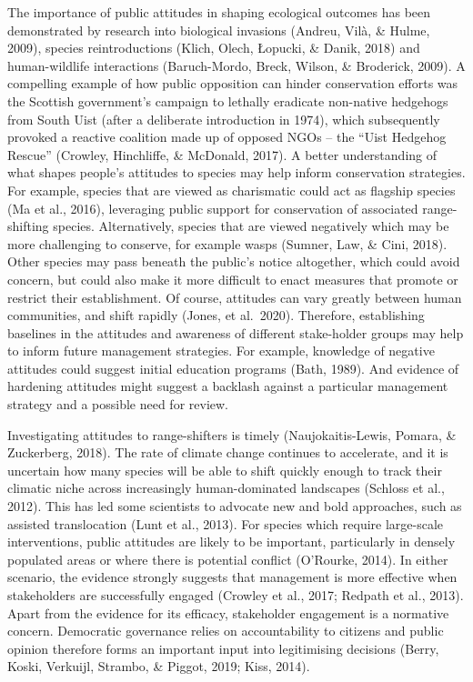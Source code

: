 \documentclass[
]{article}
\begin{document}
The importance of public attitudes in shaping ecological outcomes has
been demonstrated by research into biological invasions (Andreu, Vilà,
\& Hulme, 2009), species reintroductions (Klich, Olech, Łopucki, \&
Danik, 2018) and human-wildlife interactions (Baruch-Mordo, Breck,
Wilson, \& Broderick, 2009). A compelling example of how public
opposition can hinder conservation efforts was the Scottish government's
campaign to lethally eradicate non-native hedgehogs from South Uist
(after a deliberate introduction in 1974), which subsequently provoked a
reactive coalition made up of opposed NGOs -- the ``Uist Hedgehog
Rescue'' (Crowley, Hinchliffe, \& McDonald, 2017). A better
understanding of what shapes people's attitudes to species may help
inform conservation strategies. For example, species that are viewed as
charismatic could act as flagship species (Ma et al., 2016), leveraging
public support for conservation of associated range-shifting species.
Alternatively, species that are viewed negatively which may be more
challenging to conserve, for example wasps (Sumner, Law, \& Cini, 2018).
Other species may pass beneath the public's notice altogether, which
could avoid concern, but could also make it more difficult to enact
measures that promote or restrict their establishment. Of course,
attitudes can vary greatly between human communities, and shift rapidly
(Jones, et al.~2020). Therefore, establishing baselines in the attitudes
and awareness of different stake-holder groups may help to inform future
management strategies. For example, knowledge of negative attitudes
could suggest initial education programs (Bath, 1989). And evidence of
hardening attitudes might suggest a backlash against a particular
management strategy and a possible need for review.

Investigating attitudes to range-shifters is timely (Naujokaitis-Lewis,
Pomara, \& Zuckerberg, 2018). The rate of climate change continues to
accelerate, and it is uncertain how many species will be able to shift
quickly enough to track their climatic niche across increasingly
human-dominated landscapes (Schloss et al., 2012). This has led some
scientists to advocate new and bold approaches, such as assisted
translocation (Lunt et al., 2013). For species which require large-scale
interventions, public attitudes are likely to be important, particularly
in densely populated areas or where there is potential conflict
(O'Rourke, 2014). In either scenario, the evidence strongly suggests
that management is more effective when stakeholders are successfully
engaged (Crowley et al., 2017; Redpath et al., 2013). Apart from the
evidence for its efficacy, stakeholder engagement is a normative
concern. Democratic governance relies on accountability to citizens and
public opinion therefore forms an important input into legitimising
decisions (Berry, Koski, Verkuijl, Strambo, \& Piggot, 2019; Kiss,
2014).
\end{document}
